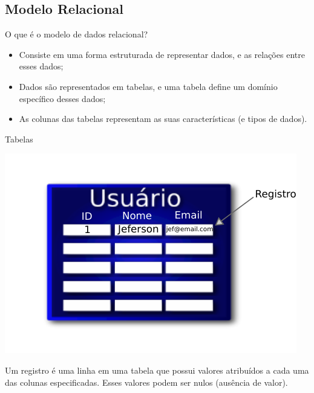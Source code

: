\documentclass[xcolor=x11names,compress]{beamer}
\begin{document}
\subsection{Modelo Relacional}
\begin{frame}{O que é o modelo de dados relacional?}

\begin{itemize}
\itemsep 5mm
\item Consiste em uma forma estruturada de representar dados, e as relações entre esses dados;

\item Dados são representados em tabelas, e uma tabela define um domínio específico desses dados;

\item As colunas das tabelas representam as suas características (e tipos de dados).


\end{itemize}

\end{frame}

\begin{frame}{Tabelas}

\begin{center}
\includegraphics[keepaspectratio,width=.6\textwidth]{db_tables}
\end{center}

\begin{block}{}
Um registro é uma linha em uma tabela que possui valores atribuídos a cada uma das colunas especificadas. Esses valores podem ser nulos (ausência de valor).
\end{block}

\end{frame}
\end{document}
